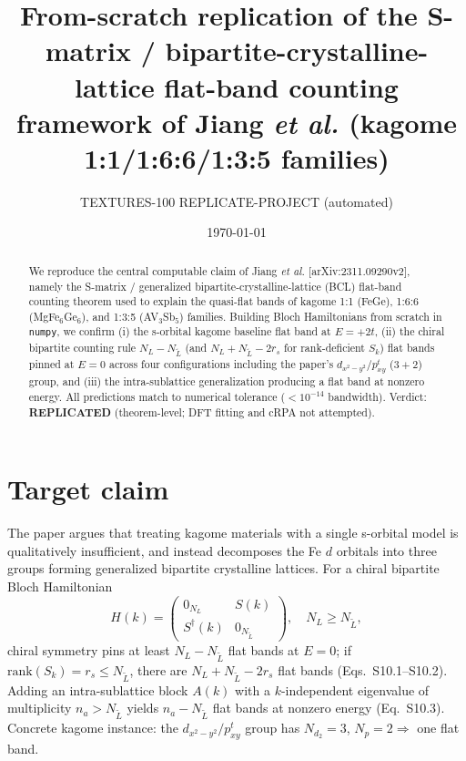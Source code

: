 \documentclass[aps,prb,twocolumn,superscriptaddress]{revtex4-2}
\begin{document}
\title{From-scratch replication of the S-matrix / bipartite-crystalline-lattice
flat-band counting framework of Jiang \emph{et al.} (kagome 1:1/1:6:6/1:3:5 families)}
\author{TEXTURES-100 REPLICATE-PROJECT (automated)}
\date{\today}

\begin{abstract}
We reproduce the central computable claim of Jiang \emph{et al.}
[arXiv:2311.09290v2], namely the S-matrix / generalized bipartite-crystalline-lattice
(BCL) flat-band counting theorem used to explain the quasi-flat bands of kagome
1:1 (FeGe), 1:6:6 (MgFe$_6$Ge$_6$), and 1:3:5 (AV$_3$Sb$_5$) families. Building
Bloch Hamiltonians from scratch in \texttt{numpy}, we confirm (i) the s-orbital
kagome baseline flat band at $E=+2t$, (ii) the chiral bipartite counting rule
$N_L-N_{\tilde L}$ (and $N_L+N_{\tilde L}-2r_s$ for rank-deficient $S_k$) flat
bands pinned at $E=0$ across four configurations including the paper's
$d_{x^2-y^2}/p^t_{xy}$ ($3{+}2$) group, and (iii) the intra-sublattice
generalization producing a flat band at nonzero energy. All predictions match to
numerical tolerance ($<10^{-14}$ bandwidth). Verdict: \textbf{REPLICATED}
(theorem-level; DFT fitting and cRPA not attempted).
\end{abstract}

\maketitle

\section{Target claim}
The paper argues that treating kagome materials with a single s-orbital model is
qualitatively insufficient, and instead decomposes the Fe $d$ orbitals into three
groups forming generalized bipartite crystalline lattices. For a chiral bipartite
Bloch Hamiltonian
\begin{equation}
H(k)=\begin{pmatrix} 0_{N_L} & S(k)\\ S^\dagger(k) & 0_{N_{\tilde L}}\end{pmatrix},
\quad N_L\ge N_{\tilde L},
\end{equation}
chiral symmetry pins at least $N_L-N_{\tilde L}$ flat bands at $E=0$; if
$\mathrm{rank}(S_k)=r_s\le N_{\tilde L}$, there are $N_L+N_{\tilde L}-2r_s$ flat
bands (Eqs.~S10.1--S10.2). Adding an intra-sublattice block $A(k)$ with a
$k$-independent eigenvalue of multiplicity $n_a>N_{\tilde L}$ yields $n_a-N_{\tilde L}$
flat bands at nonzero energy (Eq.~S10.3). Concrete kagome instance: the
$d_{x^2-y^2}/p^t_{xy}$ group has $N_{d_2}=3$, $N_p=2\Rightarrow$ one flat band.
\end{document}
